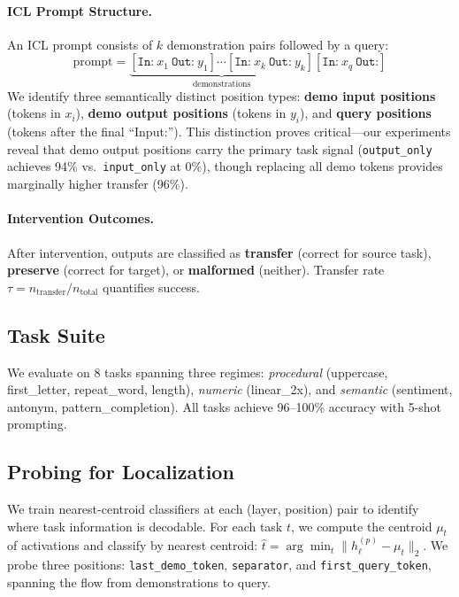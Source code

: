 \documentclass{article}
\begin{document}
\paragraph{ICL Prompt Structure.} An ICL prompt consists of $k$ demonstration pairs followed by a query:
\begin{equation}
    \text{prompt} = \underbrace{[\texttt{In:}~x_1~\texttt{Out:}~y_1] \cdots [\texttt{In:}~x_k~\texttt{Out:}~y_k]}_{\text{demonstrations}} [\texttt{In:}~x_q~\texttt{Out:}]
\end{equation}
We identify three semantically distinct position types: \textbf{demo input positions} (tokens in $x_i$), \textbf{demo output positions} (tokens in $y_i$), and \textbf{query positions} (tokens after the final ``Input:''). This distinction proves critical---our experiments reveal that demo output positions carry the primary task signal (\texttt{output\_only} achieves 94\% vs.\ \texttt{input\_only} at 0\%), though replacing all demo tokens provides marginally higher transfer (96\%).

\paragraph{Intervention Outcomes.} After intervention, outputs are classified as \textbf{transfer} (correct for source task), \textbf{preserve} (correct for target), or \textbf{malformed} (neither). Transfer rate $\tau = n_{\text{transfer}} / n_{\text{total}}$ quantifies success.

\subsection{Task Suite}

We evaluate on 8 tasks spanning three regimes: \emph{procedural} (uppercase, first\_letter, repeat\_word, length), \emph{numeric} (linear\_2x), and \emph{semantic} (sentiment, antonym, pattern\_completion). All tasks achieve 96--100\% accuracy with 5-shot prompting.

\subsection{Probing for Localization}

We train nearest-centroid classifiers at each (layer, position) pair to identify where task information is decodable. For each task $t$, we compute the centroid $\mu_t$ of activations and classify by nearest centroid: $\hat{t} = \arg\min_t \|h_\ell^{(p)} - \mu_t\|_2$. We probe three positions: \texttt{last\_demo\_token}, \texttt{separator}, and \texttt{first\_query\_token}, spanning the flow from demonstrations to query.
\end{document}
